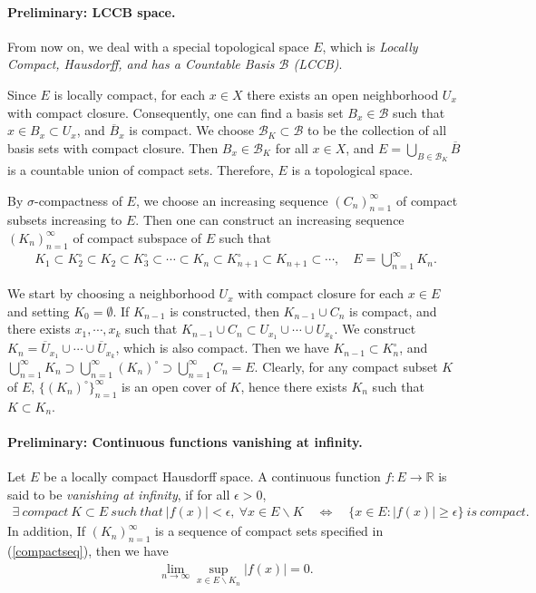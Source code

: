 \documentclass{article}
\numberwithin{equation}{section}
\theoremstyle{plain}
\theoremstyle{definition}
\begin{document}
\paragraph{Preliminary: LCCB space.} From now on, we deal with a special topological space $E$, which is \textit{Locally Compact, Hausdorff, and has a Countable Basis $\mathscr{B}$ (LCCB)}. 

Since $E$ is locally compact, for each $x\in X$ there exists an open neighborhood $U_x$ with compact closure. Consequently, one can find a basis set $B_x\in\mathscr{B}$ such that $x\in B_x\subset U_x$, and $\overline{B}_x$ is compact. We choose $\mathscr{B}_K\subset\mathscr{B}$ to be the collection of all basis sets with compact closure. Then $B_x\in\mathscr{B}_K$ for all $x\in X$, and $E=\bigcup_{B\in\mathscr{B}_K}\overline{B}$ is a countable union of compact sets. Therefore, $E$ is a  topological space.


By $\sigma$-compactness of $E$, we choose an increasing sequence $(C_n)_{n=1}^\infty$ of compact subsets increasing to $E$. Then one can construct an increasing sequence $(K_n)_{n=1}^\infty$ of compact subspace of $E$ such that
\begin{align*}
	K_1\subset K_2^\circ\subset K_2 \subset K_3^\circ\subset\cdots\subset K_n\subset K_{n+1}^\circ\subset K_{n+1}\subset\cdots,\quad E=\bigcup_{n=1}^\infty K_n.\tag{*}\label{compactseq}
\end{align*}

We start by choosing a neighborhood $U_x$ with compact closure for each $x\in E$ and setting $K_0=\emptyset$. If $K_{n-1}$ is constructed, then $K_{n-1}\cup C_n$ is compact, and there exists $x_1,\cdots,x_k$ such that $K_{n-1}\cup C_n\subset U_{x_1}\cup\cdots\cup U_{x_k}$. We construct $K_n=\overline{U}_{x_1}\cup\cdots\cup\overline{U}_{x_k}$, which is also compact. Then we have $K_{n-1}\subset K_n^\circ$, and $\bigcup_{n=1}^\infty K_n\supset\bigcup_{n=1}^\infty (K_n)^\circ\supset\bigcup_{n=1}^\infty C_n=E$. Clearly, for any compact subset $K$ of $E$, $\{(K_n)^\circ\}_{n=1}^\infty$ is an open cover of $K$, hence there exists $K_n$ such that $K\subset K_n$.


\paragraph{Preliminary: Continuous functions vanishing at infinity.} Let $E$ be a locally compact Hausdorff space. A continuous function $f:E\to\mathbb{R}$ is said to be \textit{vanishing at infinity}, if for all $\epsilon>0$,
\begin{align*}
	\exists\ compact\ K\subset E\ such\ that\ \vert f(x)\vert<\epsilon,\ \forall x\in E\backslash K\quad\Leftrightarrow\quad \{x\in E:\vert f(x)\vert\geq\epsilon\}\ is\ compact.
\end{align*}
In addition, If $(K_n)_{n=1}^\infty$ is a sequence of compact sets specified in (\ref{compactseq}), then we have
\begin{align*}
	\lim_{n\to\infty}\sup_{x\in E\backslash K_n}\vert f(x)\vert = 0.
\end{align*}
\end{document}
